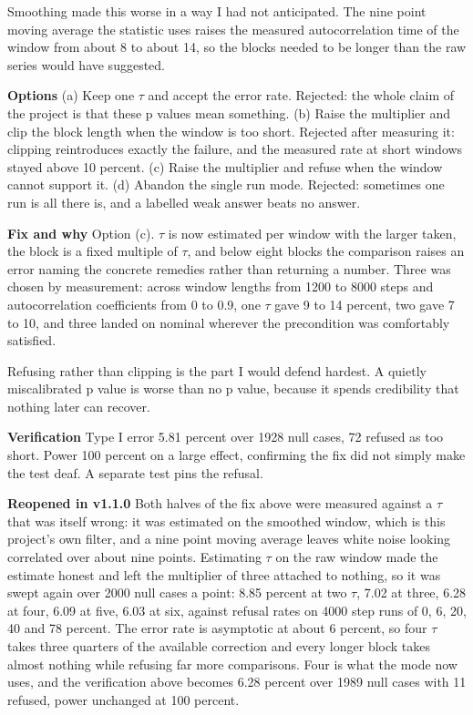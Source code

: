 \documentclass[11pt,a4paper]{article}
\newcommand{\field}[1]{\vspace{0.35em}\textbf{#1}\quad}
\begin{document}
Smoothing made this worse in a way I had not anticipated. The nine point moving
average the statistic uses raises the measured autocorrelation time of the window
from about 8 to about 14, so the blocks needed to be longer than the raw series
would have suggested.

\field{Options} (a) Keep one $\tau$ and accept the error rate. Rejected: the
whole claim of the project is that these p values mean something. (b) Raise the
multiplier and clip the block length when the window is too short. Rejected after
measuring it: clipping reintroduces exactly the failure, and the measured rate at
short windows stayed above 10 percent. (c) Raise the multiplier and refuse when
the window cannot support it. (d) Abandon the single run mode. Rejected:
sometimes one run is all there is, and a labelled weak answer beats no answer.

\field{Fix and why} Option (c). $\tau$ is now estimated per window with the larger
taken, the block is a fixed multiple of $\tau$, and below eight blocks the comparison
raises an error naming the concrete remedies rather than returning a number.
Three was chosen by measurement: across window lengths from 1200 to 8000 steps
and autocorrelation coefficients from 0 to 0.9, one $\tau$ gave 9 to 14 percent,
two gave 7 to 10, and three landed on nominal wherever the precondition was
comfortably satisfied.

Refusing rather than clipping is the part I would defend hardest. A quietly
miscalibrated p value is worse than no p value, because it spends credibility
that nothing later can recover.

\field{Verification} Type I error 5.81 percent over 1928 null cases, 72 refused
as too short. Power 100 percent on a large effect, confirming the fix did not
simply make the test deaf. A separate test pins the refusal.

\field{Reopened in v1.1.0} Both halves of the fix above were measured against a
$\tau$ that was itself wrong: it was estimated on the smoothed window, which is
this project's own filter, and a nine point moving average leaves white noise
looking correlated over about nine points. Estimating $\tau$ on the raw window
made the estimate honest and left the multiplier of three attached to nothing, so
it was swept again over 2000 null cases a point: 8.85 percent at two $\tau$, 7.02
at three, 6.28 at four, 6.09 at five, 6.03 at six, against refusal rates on 4000
step runs of 0, 6, 20, 40 and 78 percent. The error rate is asymptotic at about 6
percent, so four $\tau$ takes three quarters of the available correction and
every longer block takes almost nothing while refusing far more comparisons. Four
is what the mode now uses, and the verification above becomes 6.28 percent over
1989 null cases with 11 refused, power unchanged at 100 percent.
\end{document}
